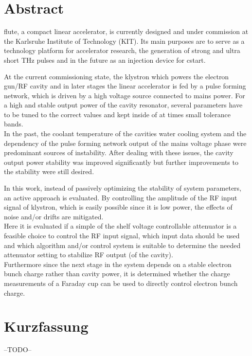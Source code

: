 \section*{Abstract}
\gls{flute}, a compact linear accelerator, is currently designed and under commission at the Karlsruhe Institute of Technology (KIT). Its main purposes are to serve as a technology platform for accelerator research, the generation of strong and ultra short THz pulses and in the future as an injection device for \gls{cstart}.

At the current commissioning state, the klystron which powers the electron gun/RF cavity and in later stages the linear accelerator is fed by a pulse forming network, which is driven by a high voltage source connected to mains power. For a high and stable output power of the cavity resonator, several parameters have to be tuned to the correct values and kept inside of at times small tolerance bands.\\
In the past, the coolant temperature of the cavities water cooling system and the dependency of the pulse forming network output of the mains voltage phase were predominant sources of instability. After dealing with these issues, the cavity output power stability was improved significantly but further improvements to the stability were still desired.

In this work, instead of passively optimizing the stability of system parameters, an active approach is evaluated. By controlling the amplitude of the RF input signal of klystron, which is easily possible since it is low power, the effects of noise and/or drifts are mitigated.\\
Here it is evaluated if a simple of the shelf voltage controllable attenuator is a feasible choice to control the RF input signal, which input data should be used and which algorithm and/or control system is suitable to determine the needed attenuator setting to stabilize RF output (of the cavity).\\
Furthermore since the next stage in the system depends on a stable electron bunch charge rather than cavity power, it is determined whether the charge measurements of a Faraday cup can be used to directly control electron bunch charge.

\section*{Kurzfassung}
--TODO--